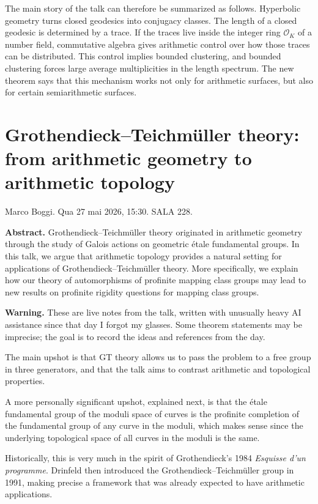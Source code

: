 \medskip\noindent
The main story of the talk can therefore be
summarized as follows. Hyperbolic geometry
turns closed geodesics into conjugacy classes.
The length of a closed geodesic is determined
by a trace. If the traces live inside the
integer ring $\mathcal{O}_K$ of a number
field, commutative algebra gives arithmetic
control over how those traces can be
distributed. This control implies bounded
clustering, and bounded clustering forces
large average multiplicities in the length
spectrum. The new theorem says that this
mechanism works not only for arithmetic
surfaces, but also for certain
semiarithmetic surfaces.

\section{Grothendieck--Teichm\"uller theory: from arithmetic geometry to arithmetic topology}
\label{section-grothendieck-teichmuller-arithmetic-topology}

\noindent
Marco Boggi.
Qua 27 mai 2026, 15:30.
SALA 228.

\medskip\noindent
{\bf Abstract.}
Grothendieck--Teichm\"uller theory originated
in arithmetic geometry through the study of
Galois actions on geometric \'etale
fundamental groups. In this talk, we argue
that arithmetic topology provides a natural
setting for applications of
Grothendieck--Teichm\"uller theory. More
specifically, we explain how our theory of
automorphisms of profinite mapping class
groups may lead to new results on profinite
rigidity questions for mapping class groups.

\medskip\noindent
{\bf Warning.}
These are live notes from the talk,
written with unusually heavy AI assistance
since that day I forgot my glasses.
Some theorem
statements may be imprecise; the goal is to
record the ideas and references from the day.\medskip\noindent

\medskip\noindent
The main upshot is that GT theory allows us
to pass the problem to a free group in three
generators, and that the talk aims to
contrast arithmetic and topological
properties.

A more personally significant 
upshot, explained next,
is that the étale fundamental
group of the moduli space of curves
is the profinite completion of
the fundamental group of any curve in 
the moduli, which makes sense since the
underlying topological space of all curves
in the moduli is the same.

\medskip\noindent
Historically, this is very much in the spirit
of Grothendieck's 1984 \emph{Esquisse d'un
programme}. Drinfeld then introduced the
Grothendieck--Teichm\"uller group in 1991,
making precise a framework that was already
expected to have arithmetic applications.

